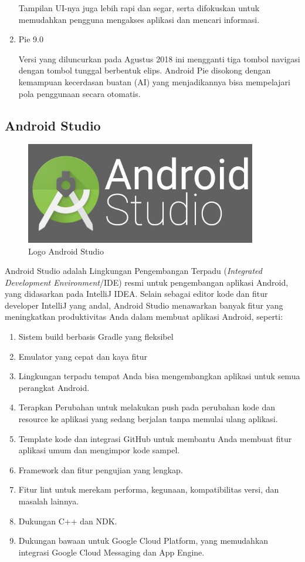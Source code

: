 \begin{enumerate}
\par Tampilan UI-nya juga lebih rapi dan segar, serta difokuskan untuk memudahkan pengguna mengakses aplikasi dan mencari informasi.
\item Pie 9.0
\par Versi yang diluncurkan pada Agustus 2018 ini mengganti tiga tombol navigasi dengan tombol tunggal berbentuk elips. Android Pie disokong dengan kemampuan kecerdasan buatan (AI) yang menjadikannya bisa mempelajari pola penggunaan secara otomatis.
\end{enumerate}
\subsection{Android Studio}
\begin{figure}[H]
    \centering
    \includegraphics[width=0.9\textwidth]{figures/android3.jpeg}
    \caption{Logo Android Studio}
    \label{print}
    \end{figure}
\par Android Studio adalah Lingkungan Pengembangan Terpadu (\textit{Integrated Development Environment}/IDE) resmi untuk pengembangan aplikasi Android, yang didasarkan pada IntelliJ IDEA. Selain sebagai editor kode dan fitur developer IntelliJ yang andal, Android Studio menawarkan banyak fitur yang meningkatkan produktivitas Anda dalam membuat aplikasi Android, seperti:
\begin{enumerate}
    \item Sistem build berbasis Gradle yang fleksibel
    \item Emulator yang cepat dan kaya fitur
    \item Lingkungan terpadu tempat Anda bisa mengembangkan aplikasi untuk semua perangkat Android.
    \item Terapkan Perubahan untuk melakukan push pada perubahan kode dan resource ke aplikasi yang sedang berjalan tanpa memulai ulang aplikasi.
    \item Template kode dan integrasi GitHub untuk membantu Anda membuat fitur aplikasi umum dan mengimpor kode sampel.
    \item Framework dan fitur pengujian yang lengkap.
    \item Fitur lint untuk merekam performa, kegunaan, kompatibilitas versi, dan masalah lainnya.
    \item Dukungan C++ dan NDK.
    \item Dukungan bawaan untuk Google Cloud Platform, yang memudahkan integrasi Google Cloud Messaging dan App Engine.
\end{enumerate}

